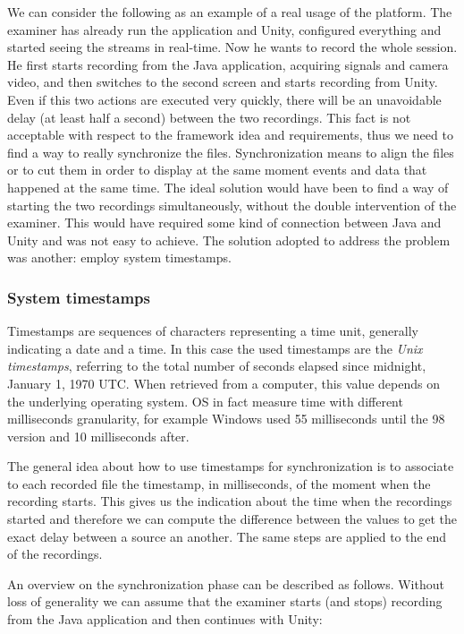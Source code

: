 \documentclass[binding=0.6cm,LaM]{sapthesis}
\begin{document}
We can consider the following as an example of a real usage of the platform. The examiner has already run the application and Unity, configured everything and started seeing the streams in real-time. Now he wants to record the whole session. He first starts recording from the Java application, acquiring signals and camera video, and then switches to the second screen and starts recording from Unity. Even if this two actions are executed very quickly, there will be an unavoidable delay (at least half a second) between the two recordings.
This fact is not acceptable with respect to the framework idea and requirements, thus we need to find a way to really synchronize the files. 
Synchronization means to align the files or to cut them in order to display at the same moment events and data that happened at the same time. The ideal solution would have been to find a way of starting the two recordings simultaneously, without the double intervention of the examiner. This would have required some kind of connection between Java and Unity and was not easy to achieve. The solution adopted to address the problem was another: employ system timestamps.

\subsubsection{System timestamps}

Timestamps are sequences of characters representing a time unit, generally indicating a date and a time. In this case the used timestamps are the \textit{Unix timestamps}, referring to the total number of seconds elapsed since midnight, January 1, 1970 UTC. When retrieved from a computer, this value depends on the underlying operating system. OS in fact measure time with different milliseconds granularity, for example Windows used 55 milliseconds until the 98 version and 10 milliseconds after. 

The general idea about how to use timestamps for synchronization is to associate to each recorded file the timestamp, in milliseconds, of the moment when the recording starts. This gives us the indication about the time when the recordings started and therefore we can compute the difference between the values to get the exact delay between a source an another. The same steps are applied to the end of the recordings. 

An overview on the synchronization phase can be described as follows. Without loss of generality we can assume that the examiner starts (and stops) recording from the Java application and then continues with Unity:
\end{document}
